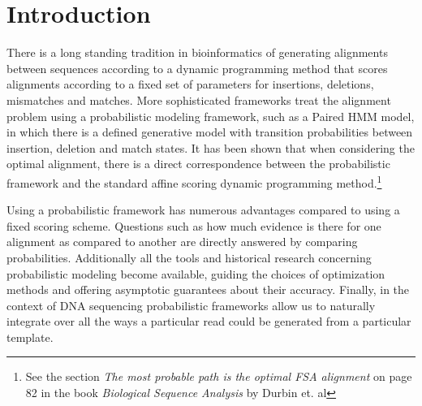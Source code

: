 \documentclass[fleqn,10pt]{SelfArx} %
\begin{document}
\flushbottom %

\maketitle %

\tableofcontents %

\thispagestyle{empty} %


\section{Introduction} %


There is a long standing tradition in bioinformatics of generating alignments between sequences according to a dynamic programming method that scores alignments according to a fixed set of parameters for insertions, deletions, mismatches and matches.  More sophisticated frameworks treat the alignment problem using a probabilistic modeling framework, such as a Paired HMM model, in which there is a defined generative model with transition probabilities between insertion, deletion and match states.  It has been shown that when considering the optimal alignment, there is a direct correspondence between the probabilistic framework and the standard affine scoring dynamic programming method.\footnote{See the section \textit{The most probable path is the optimal FSA alignment} on page 82 in the book \textit{Biological Sequence Analysis} by Durbin et. al}

Using a probabilistic framework has numerous advantages compared to using a fixed scoring scheme.  Questions such as how much evidence is there for one alignment as compared to another are directly answered by comparing probabilities.  Additionally all the tools and historical research concerning probabilistic modeling become available, guiding the choices of optimization methods and offering asymptotic guarantees about their accuracy.  Finally, in the context of DNA sequencing probabilistic frameworks allow us to naturally integrate over all the ways a particular read could be generated from a particular template.
\end{document}
